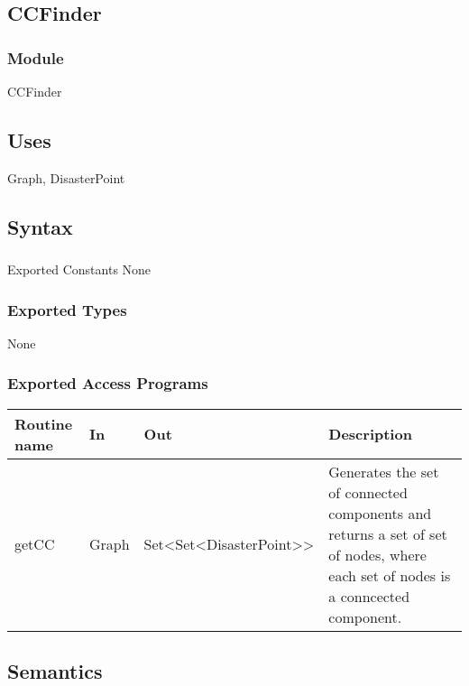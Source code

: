 \documentclass[12pt]{article}
\begin{document}
                \subsection* {CCFinder}
                
                \subsubsection*{Module}
                CCFinder
                
                \subsection* {Uses}
                Graph, DisasterPoint
                
                \subsection* {Syntax}
                
                \subsubsection*{} {Exported Constants}
                None

                \subsubsection* {Exported Types}
                None

                \subsubsection* {Exported Access Programs}
                
                
                \begin{tabular}{| l | l | l | p{5cm} |}
                \hline
                \textbf{Routine name} & \textbf{In} & \textbf{Out} & \textbf{Description}\\
                \hline
                getCC & Graph & Set<Set<DisasterPoint>> & Generates the set of connected components and returns a set of set of nodes, where
                each set of nodes is a conncected component.\\
                \hline
                \end{tabular}
                
                \subsection* {Semantics}
\end{document}
